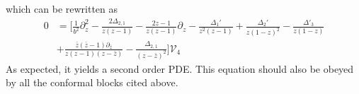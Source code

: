 \documentclass[a4paper]{article}
\begin{document}
which can be rewritten as
\begin{equation}
\begin{aligned}
  0&=\Bigg[\frac{1}{b^2}\partial_z^2-\frac{2\Delta_{2,1}}{z(z-1)}-\frac{2z-1}{z(z-1)}\partial_z -\frac{\Delta_1'}{z^2(z-1)}+\frac{\Delta_2'}{z(1-z)^2}-\frac{\Delta'_3}{z(1-z)}\\
  &+\frac{\bar{z}(\bar{z}-1)\partial_{\bar{z}}}{z(z-1)(z-\bar{z})}-\frac{\Delta_{2,1}}{(z-\bar{z})^2}\Bigg]\mathcal{V}_{4}
\end{aligned}
\end{equation}
As expected, it yields a second order PDE. This equation should also be obeyed by all the conformal blocks cited above.
\end{document}
